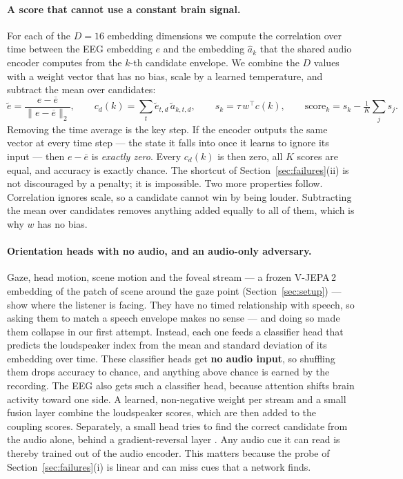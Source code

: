 \paragraph{A score that cannot use a constant brain signal.}
\label{sec:coupling}
For each of the $D\!=\!16$ embedding dimensions we compute the correlation over
time between the EEG embedding $e$ and the embedding $\hat a_k$ that the shared
audio encoder computes from the $k$-th candidate envelope. We
combine the $D$ values with a weight vector that has no bias, scale by a learned
temperature, and subtract the mean over candidates:
\begin{equation}
  \tilde e=\frac{e-\overline{e}}{\lVert e-\overline{e}\rVert_2},\qquad
  c_d(k)=\textstyle\sum_t \tilde e_{t,d}\,\tilde a_{k,t,d},\qquad
  s_k=\tau\, w^{\!\top} c(k),\qquad
  \mathrm{score}_k=s_k-\tfrac1K\textstyle\sum_j s_j .
  \label{eq:coupling}
\end{equation}
Removing the time average is the key step. If the encoder outputs the same
vector at every time step --- the state it falls into once it learns to ignore
its input --- then $e-\overline e$ is \emph{exactly zero}. Every $c_d(k)$ is
then zero, all $K$ scores are equal, and accuracy is exactly chance. The
shortcut of Section~\ref{sec:failures}(ii) is not discouraged by a penalty; it is
impossible. Two more properties follow. Correlation ignores scale, so a candidate
cannot win by being louder. Subtracting the mean over candidates removes anything
added equally to all of them, which is why $w$ has no bias.

\paragraph{Orientation heads with no audio, and an audio-only adversary.}
Gaze, head motion, scene motion and the foveal stream --- a frozen V-JEPA\,2
embedding of the patch of scene around the gaze point
(Section~\ref{sec:setup}) --- show where the listener is facing. They have no
timed relationship with speech, so asking them to match a speech envelope makes
no sense --- and doing so made them collapse in our first attempt. Instead, each
one feeds a classifier head that predicts the loudspeaker index from the mean
and standard deviation of its embedding over time. These classifier heads get
\textbf{no audio input}, so shuffling them drops accuracy to chance, and anything
above chance is earned by the recording. The EEG also gets such a classifier
head, because attention shifts brain activity toward one side. A learned, non-negative weight
per stream and a small fusion layer combine the loudspeaker scores, which are then
added to the coupling scores. Separately, a small head tries to find the correct
candidate from the audio alone, behind a gradient-reversal layer
\citep{ganin2015}. Any audio cue it can read is thereby trained out of the audio
encoder. This matters because the probe of Section~\ref{sec:failures}(i) is
linear and can miss cues that a network finds.

